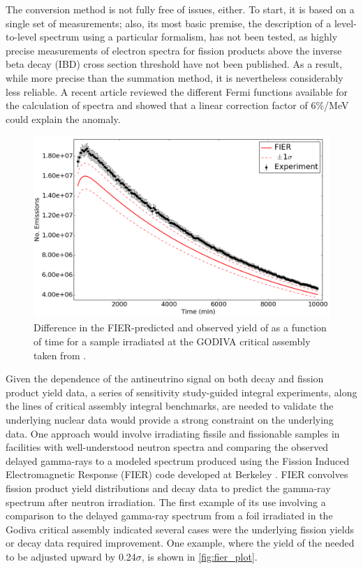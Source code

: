 \documentclass[letterpaper]{ar-1col}
\begin{document}
The conversion method is not fully free of issues, either.
 To start, it is based on a single set of measurements; also, its most basic premise, the description of a level-to-level spectrum using a particular formalism, has not been tested, as highly precise measurements of electron spectra for fission products above the inverse beta decay (IBD) cross section threshold have not been published.
   As a result, while more precise than the summation method, it is nevertheless considerably less reliable.
    A recent article \cite{Son17} reviewed the different Fermi functions available for the calculation of spectra and showed that a linear correction factor of 6\%/MeV could explain the anomaly.



\begin{figure}[b]
 \centering
 \includegraphics[width=0.7\linewidth]{667_before_alt.png}

 \caption{Difference in the FIER-predicted and observed yield of  as a function of time for a  sample irradiated at the GODIVA critical assembly taken from \cite{Matthews2018}.  }
 \label{fig:fier_plot}
\end{figure}

Given the dependence of the antineutrino signal on both decay and fission product yield data, a series of sensitivity study-guided integral experiments, along the lines of critical assembly integral benchmarks, are needed to validate the underlying nuclear data would provide a strong constraint on the underlying data.
 One approach would involve irradiating fissile and fissionable samples in facilities with well-understood neutron spectra and comparing the observed delayed gamma-rays to a modeled spectrum produced using the Fission Induced Electromagnetic Response (FIER) code developed at Berkeley \cite{Matthews2018}.
 FIER convolves fission product yield distributions and decay data to predict the gamma-ray spectrum after neutron irradiation.
 The first example of its use involving a comparison to the delayed gamma-ray spectrum from a  foil irradiated in the Godiva critical assembly indicated several cases were the underlying fission yields or decay data required improvement.
One example, where the yield of the  needed to be adjusted upward by 0.24$\sigma$, is shown in \autoref{fig:fier_plot}.  
\end{document}
